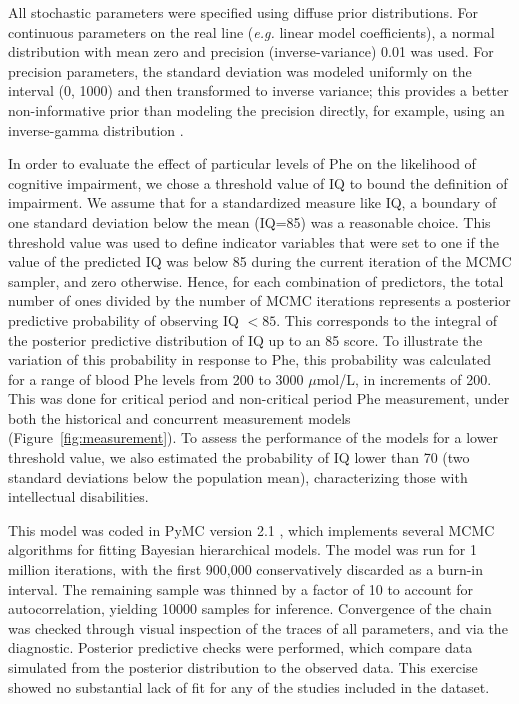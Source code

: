 \documentclass{svjour3}                     %
\begin{document}
All stochastic parameters were specified using diffuse prior distributions. For continuous parameters on the real line (\emph{e.g.} linear model coefficients), a normal distribution with mean zero and precision (inverse-variance) 0.01 was used. For precision parameters, the standard deviation was modeled uniformly on the interval (0, 1000) and then transformed to inverse variance; this provides a better non-informative prior than modeling the precision directly, for example, using an inverse-gamma distribution \citep{Gelman:2006uw}.

In order to evaluate the effect of particular levels of Phe on the likelihood of cognitive impairment, we chose a threshold value of IQ to bound the definition of impairment. We assume that for a standardized measure like IQ, a boundary of one standard deviation below the mean (IQ=85) was a reasonable choice. This threshold value was used to define indicator variables that were set to one if the value of the predicted IQ was below 85 during the current iteration of the MCMC sampler, and zero otherwise. Hence, for each combination of predictors, the total number of ones divided by the number of MCMC iterations represents a posterior predictive probability of observing IQ $< 85$. This corresponds to the integral of the posterior predictive distribution of IQ up to an 85 score. To illustrate the variation of this probability in response to Phe, this probability was calculated for a range of blood Phe levels from 200 to 3000 $\mu$mol/L, in increments of 200.  This was done for critical period and non-critical period Phe measurement, under both the historical and concurrent measurement models (Figure~\ref{fig:measurement}). To assess the performance of the models for a lower threshold value, we also estimated the probability of IQ lower than 70 (two standard deviations below the population mean), characterizing those with intellectual disabilities.

This model was coded in PyMC version 2.1 \citep{Patil:2010tx}, which implements several MCMC algorithms for fitting Bayesian hierarchical models. The model was run for 1 million iterations, with the first 900,000 conservatively discarded as a burn-in interval. The remaining sample was thinned by a factor of 10 to account for autocorrelation, yielding 10000 samples for inference. Convergence of the chain was checked through visual inspection of the traces of all parameters, and via the \citet{Geweke:1992tk} diagnostic. Posterior predictive checks \citep{Gelman:2003vk} were performed, which compare data simulated from the posterior distribution to the observed data. This exercise showed no substantial lack of fit for any of the studies included in the dataset.
\end{document}

